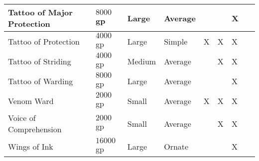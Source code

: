 \documentclass[a5paper,8pt]{book}
\begin{document}
\begin{tabularx}{\textwidth}{|lZZZYYYY|}
    Tattoo of Major Protection & $8000$gp  &  Large  & Average & ~ & ~ & X & ~ \\\hline 
    Tattoo of Protection & $4000$gp  &  Large  & Simple  & X & X & X & ~ \\\hline 
    Tattoo of Striding & $4000$gp  &  Medium & Average & ~ & X & X & ~ \\\hline 
    Tattoo of Warding & $8000$gp  &  Large  & Average & ~ & ~ & X & ~ \\\hline 
    Venom Ward & $2000$gp  &  Small  & Average & X & X & X & ~ \\\hline 
    Voice of Comprehension & $2000$gp  &  Small  & Average & ~ & X & X & ~ \\\hline
    Wings of Ink & $16000$gp &  Large  & Ornate  & ~ & ~ & X & ~ \\\hline 
\end{tabularx}
\end{document}
